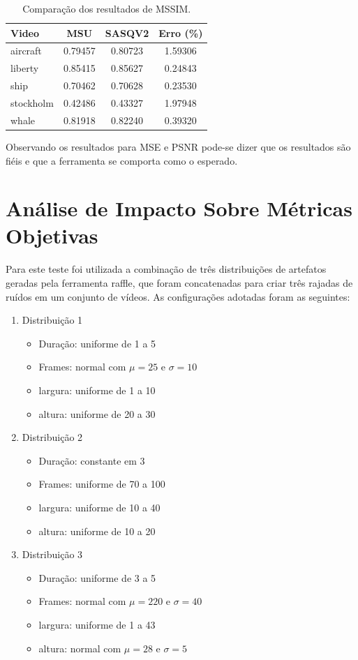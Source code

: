 \begin{table}[!htb]
	\centering
	\caption{Comparação dos resultados de MSSIM.}
	\label{res:mssim}
	\begin{tabular}{lccc}
	\hline
	Video	 & MSU	 & SASQV2	 & Erro (\%) \\ \hline
	aircraft	 & 0.79457 & 0.80723 & 1.59306	 \\
	liberty	 & 0.85415 & 0.85627 & 0.24843	 \\
	ship	 & 0.70462 & 0.70628 & 0.23530	 \\ 
	stockholm & 0.42486 & 0.43327 & 1.97948	 \\ 
	whale	 & 0.81918 & 0.82240 & 0.39320	 \\
	\hline
	\end{tabular}
\end{table}

Observando os resultados para MSE e PSNR pode-se dizer que os resultados são fiéis e que a ferramenta se comporta como o esperado.

\section{Análise de Impacto Sobre Métricas Objetivas}



Para este teste foi utilizada a combinação de três distribuições de artefatos geradas pela ferramenta raffle, que foram concatenadas para criar três rajadas de ruídos em um conjunto de vídeos. As configurações adotadas foram as seguintes:

\begin{enumerate}
	\item Distribuição 1
	\begin{itemize}
		\item Duração: uniforme de 1 a 5
		\item Frames: normal com \(\mu = 25\) e \(\sigma = 10\)
		\item largura: uniforme de 1 a 10
		\item altura: uniforme de 20 a 30
	\end{itemize}
	\item Distribuição 2
	\begin{itemize}
		\item Duração: constante em 3
		\item Frames: uniforme de 70 a 100
		\item largura: uniforme de 10 a 40
		\item altura: uniforme de 10 a 20
	\end{itemize}
	\item Distribuição 3
	\begin{itemize}
		\item Duração: uniforme de 3 a 5
		\item Frames: normal com \(\mu = 220\) e \(\sigma = 40\)
		\item largura: uniforme de 1 a 43
		\item altura: normal com \(\mu = 28\) e \(\sigma = 5\)
	\end{itemize}
\end{enumerate}

